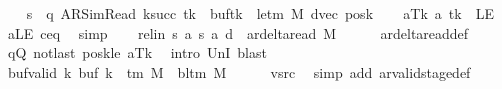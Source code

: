 \begin{isabellebody}
\ \ \isamarkupfalse%
\ {\isacharquery}{\kern0pt}s{\isacharprime}{\kern0pt}\ {\isacharequal}{\kern0pt}\ {\isachardoublequoteopen}{\isacharparenleft}{\kern0pt}q{\isacharcomma}{\kern0pt}\ AR{\isacharunderscore}{\kern0pt}SimRead{\isacharcomma}{\kern0pt}\ k{\isacharunderscore}{\kern0pt}succ\ tk{\isacharcomma}{\kern0pt}\ {}{\isacharcomma}{\kern0pt}\ buf{\isacharparenleft}{\kern0pt}tk\ {\isacharcolon}{\kern0pt}{\isacharequal}{\kern0pt}\ le{\isacharunderscore}{\kern0pt}tm\ M{\isacharparenright}{\kern0pt}{\isacharcomma}{\kern0pt}\ dvec{\isacharcomma}{\kern0pt}\ posk{\isacharparenright}{\kern0pt}{\isachardoublequoteclose}\isanewline
\ \ \isamarkupfalse%
\ aTk{\isacharcolon}{\kern0pt}\ {\isachardoublequoteopen}{\isacharquery}{\kern0pt}a\ tk\ {\isacharequal}{\kern0pt}\ LE{}{\isachardoublequoteclose}\ \isamarkupfalse%
\ aLE\ c{\isacharprime}{\kern0pt}{\isacharunderscore}{\kern0pt}eq\ \isamarkupfalse%
\ simp\isanewline
\ \ \isamarkupfalse%
\ rel{\isacharunderscore}{\kern0pt}in{\isacharcolon}{\kern0pt}\ {\isachardoublequoteopen}{\isacharparenleft}{\kern0pt}{\isacharquery}{\kern0pt}s{\isacharcomma}{\kern0pt}\ {\isacharquery}{\kern0pt}a{\isacharcomma}{\kern0pt}\ {\isacharquery}{\kern0pt}s{\isacharprime}{\kern0pt}{\isacharcomma}{\kern0pt}\ {\isacharquery}{\kern0pt}a{\isacharcomma}{\kern0pt}\ {\isacharquery}{\kern0pt}d{\isacharparenright}{\kern0pt}\ {\isasymin}\ ar{\isacharunderscore}{\kern0pt}delta{\isacharunderscore}{\kern0pt}read\ M{\isachardoublequoteclose}\isanewline
\ \ \ \ \isamarkupfalse%
\ ar{\isacharunderscore}{\kern0pt}delta{\isacharunderscore}{\kern0pt}read{\isacharunderscore}{\kern0pt}def\isanewline
\ \ \ \ \isamarkupfalse%
\ qQ\ notlast\ posk{\isacharunderscore}{\kern0pt}le\ aTk\ \isamarkupfalse%
\ {\isacharparenleft}{\kern0pt}intro\ UnI{}{\isacharparenright}{\kern0pt}\ blast\isanewline
\ \ \isamarkupfalse%
\ buf{\isacharunderscore}{\kern0pt}valid{\isacharcolon}{\kern0pt}\ {\isachardoublequoteopen}{\isasymforall}k{\isachardot}{\kern0pt}\ buf\ k\ {\isasymin}\ {\isasymGamma}{\isacharunderscore}{\kern0pt}tm\ M\ {\isasymunion}\ {\isacharbraceleft}{\kern0pt}bl{\isacharunderscore}{\kern0pt}tm\ M{\isacharbraceright}{\kern0pt}{\isachardoublequoteclose}\isanewline
\ \ \ \ \isamarkupfalse%
\ vsrc\ \isamarkupfalse%
\ {\isacharparenleft}{\kern0pt}simp\ add{\isacharcolon}{\kern0pt}\ ar{\isacharunderscore}{\kern0pt}valid{\isacharunderscore}{\kern0pt}stage{\isacharunderscore}{\kern0pt}def{\isacharparenright}{\kern0pt}\isanewline

\end{isabellebody}
